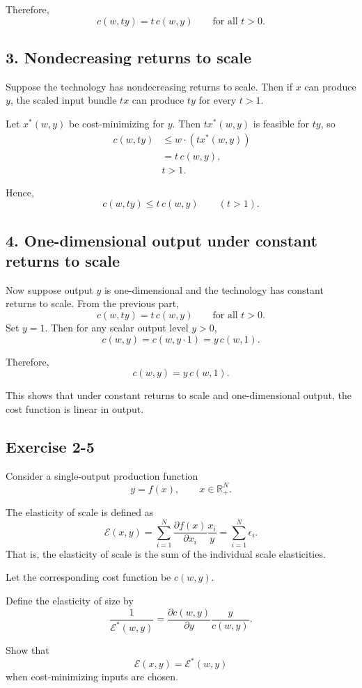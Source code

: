 Therefore,
\[
\boxed{c(w,ty)=t\,c(w,y)\qquad \text{for all } t>0.}
\]

\subsection*{3. Nondecreasing returns to scale}

Suppose the technology has nondecreasing returns to scale.  
Then if \(x\) can produce \(y\), the scaled input bundle \(tx\) can produce \(ty\) for every \(t>1\).

Let \(x^*(w,y)\) be cost-minimizing for \(y\). Then \(t x^*(w,y)\) is feasible for \(ty\), so
\[
\begin{aligned}\
c(w,ty)
&\le w\cdot (t x^*(w,y))\\
&=t\,c(w,y),\\
&t>1.
\end{aligned}
\]

Hence,
\[
\boxed{c(w,ty)\le t\,c(w,y)\qquad (t>1).}
\]

\subsection*{4. One-dimensional output under constant returns to scale}

Now suppose output \(y\) is one-dimensional and the technology has constant returns to scale. From the previous part,
\[
c(w,ty)=t\,c(w,y)
\qquad \text{for all } t>0.
\]
Set \(y=1\). Then for any scalar output level \(y>0\),
\[
c(w,y)=c(w,y\cdot 1)=y\,c(w,1).
\]

Therefore,
\[
\boxed{c(w,y)=y\,c(w,1).}
\]

This shows that under constant returns to scale and one-dimensional output, the cost function is linear in output.



\vspace{30pt}
\begin{tcolorbox}[breakable]

\subsection*{Exercise 2-5}

Consider a single-output production function
\[
y=f(x), \qquad x \in \mathbb{R}_+^N.
\]

The elasticity of scale is defined as
\[
\mathcal{E}(x,y)
=
\sum_{i=1}^N \frac{\partial f(x)}{\partial x_i}\frac{x_i}{y}
=
\sum_{i=1}^N \epsilon_i.
\]
That is, the elasticity of scale is the sum of the individual scale elasticities.

Let the corresponding cost function be $c(w,y)$.

Define the elasticity of size by
\[
\frac{1}{\mathcal{E}^*(w,y)}
=
\frac{\partial c(w,y)}{\partial y}\frac{y}{c(w,y)}.
\]

Show that
\[
\mathcal{E}(x,y)=\mathcal{E}^*(w,y)
\]
when cost-minimizing inputs are chosen.

\end{tcolorbox}



